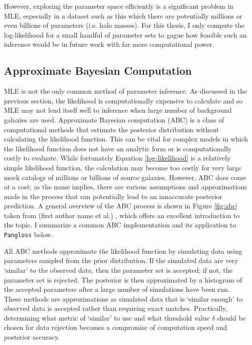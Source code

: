 \documentclass[%
 reprint,
 amsmath,amssymb,
 aps,nofootinbib
]{revtex4-1}
\begin{document}
However, exploring the parameter space efficiently is a significant problem in MLE, especially in a dataset such as this which there are potentially millions or even billions of parameters (i.e. halo masses). For this thesis, I only compute the log-likelihood for a small handful of parameter sets to gague how feasible such an inference would be in future work with far more computational power.

\subsection{Approximate Bayesian Computation} \label{abc}

MLE is not the only common method of parameter inference. As discussed in the previous section, the likelihood is computationally expensive to calculate and so MLE may not lend itself well to inference when large number of background galaxies are used. Approximate Bayesian computation (ABC) is a class of computational methods that estimate the posterior distribution without calculating the likelihood function. This can be vital for complex models in which the likelihood function does not have an analytic form or is computationally costly to evaluate. While fortunately Equation \eqref{log-likelihood} is a relatively simple likelihood function, the calculation may become too costly for very large mock catalogs of millions or billions of source galaxies. However, ABC does come at a cost; as the name implies, there are various assumptions and approximations made in the process that can potentially lead to an innaccurate posterior prediction. A general overview of the ABC process is shown in Figure \ref{fig:abc} taken from (first author name et al.) \cite{abc}, which offers an excellent introduction to the topic. I summarize a common ABC implementation and its application to \texttt{Pangloss} below.


All ABC methods approximate the likelihood function by simulating data using parameters sampled from the prior distribution. If the simulated data are very `similar' to the observed data, then the parameter set is accepted; if not, the parameter set is rejected. The posterior is then approximated by a histogram of the accepted parameters after a large number of simulations have been run. These methods are approximations as simulated data that is `similar enough' to observed data is accepted rather than requiring exact matches. Practically, determining what metric of `similar' to use and what threshold value $\delta$ should be chosen for data rejection becomes a compromise of computation speed and posterior accuracy.
\end{document}
